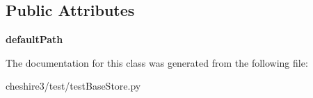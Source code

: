 \subsection*{Public Attributes}
\begin{DoxyCompactItemize}
\item 
\hypertarget{classcheshire3_1_1test_1_1test_base_store_1_1_user_path_bdb_store_test_case_a72c5d96eb523649d93c018a60a842b8b}{{\bfseries default\-Path}}\label{classcheshire3_1_1test_1_1test_base_store_1_1_user_path_bdb_store_test_case_a72c5d96eb523649d93c018a60a842b8b}

\end{DoxyCompactItemize}


The documentation for this class was generated from the following file\-:\begin{DoxyCompactItemize}
\item 
cheshire3/test/test\-Base\-Store.\-py\end{DoxyCompactItemize}
